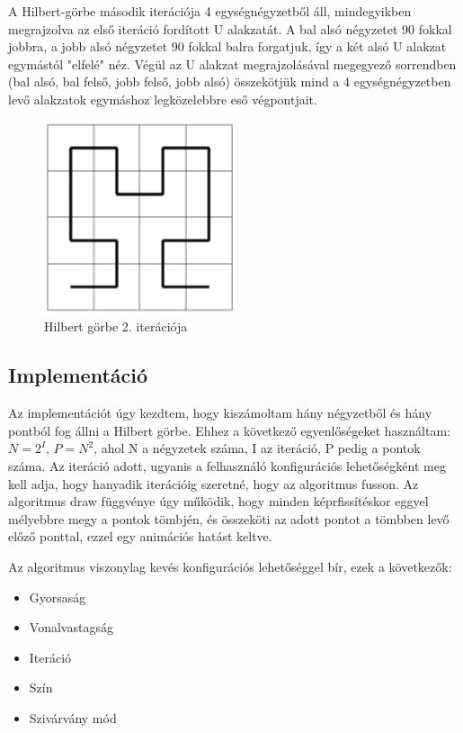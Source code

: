 A Hilbert-görbe második iterációja 4 egységnégyzetből áll, mindegyikben megrajzolva az első iteráció fordított U alakzatát. A bal alsó négyzetet 90 fokkal jobbra, a jobb alsó négyzetet 90 fokkal balra forgatjuk, így a két alsó U alakzat egymástól "elfelé" néz. Végül az U alakzat megrajzolásával megegyező sorrendben (bal alsó, bal felső, jobb felső, jobb alsó) összekötjük mind a 4 egységnégyzetben levő alakzatok egymáshoz legközelebbre eső végpontjait.
\begin{figure}[!ht]
	\begin{center}
	\includegraphics[width=0.5\textwidth]{img/HilbertCurve2-1}
	\caption[labelInTOC]{Hilbert görbe 2. iterációja}
\end{center}
\end{figure}
\subsection*{Implementáció}
Az implementációt úgy kezdtem, hogy kiszámoltam hány négyzetből és hány pontból fog állni a Hilbert görbe. Ehhez a következő egyenlőségeket használtam:\\
$N = 2^I$,
$P = N^2$, ahol N a négyzetek száma, I az iteráció, P pedig a pontok száma. Az iteráció adott, ugyanis a felhasználó konfigurációs lehetőségként meg kell adja, hogy hanyadik iterációig szeretné, hogy az algoritmus fusson. Az algoritmus draw függvénye úgy működik, hogy minden képrfissítéskor eggyel mélyebbre megy a pontok tömbjén, és összeköti az adott pontot a tömbben levő előző ponttal, ezzel egy animációs hatást keltve. 
\par Az algoritmus viszonylag kevés konfigurációs lehetőséggel bír, ezek a következők:
\begin{itemize}
	\item Gyorsaság
	\item Vonalvastagság
	\item Iteráció
	\item Szín
	\item Szivárvány mód
\end{itemize}

